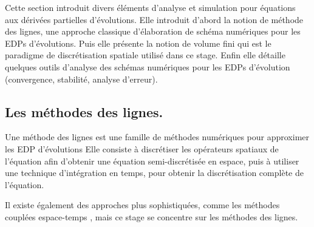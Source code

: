     Cette section introduit divers éléments d'analyse et simulation pour équations aux dérivées partielles d'évolutions.
    Elle introduit d'abord la notion de méthode des lignes, une approche classique d'élaboration de schéma numériques pour les EDPs d'évolutions.
    Puis elle présente la notion de volume fini qui est le paradigme de discrétisation spatiale utilisé dans ce stage.
    Enfin elle détaille quelques outils d'analyse des schémas numériques pour les EDPs d'évolution (convergence, stabilité, analyse d'erreur).
    \subsection{Les méthodes des lignes.}
    \begin{definition}
        Une méthode des lignes est une famille de méthodes numériques pour approximer les EDP d'évolutions
        Elle consiste à discrétiser les opérateurs spatiaux de l'équation afin d'obtenir une équation semi-discrétisée en espace,
        puis à utiliser une technique d'intégration en temps, pour obtenir la discrétisation complète de l'équation.
    \end{definition}

    Il existe également des approches plus sophistiquées, comme les méthodes couplées espace-temps \cite{DARU2004563}, mais ce stage se concentre sur les méthodes des lignes.
